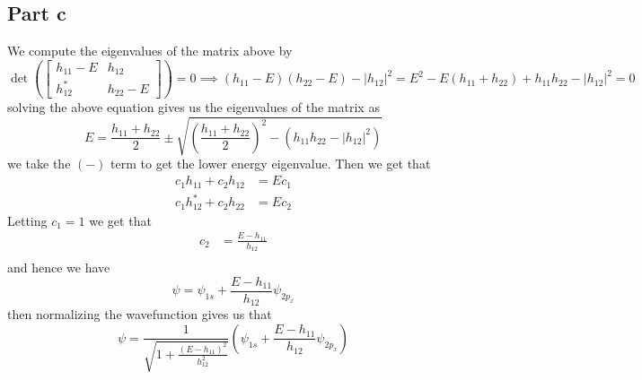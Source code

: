 \documentclass[12pt]{report}
\begin{document}
\subsection*{Part c}
We compute the eigenvalues of the matrix above by
\begin{equation*}
  \det\left(\begin{bmatrix} 
    h_{11} -E & h_{12} \\
    h_{12}^* & h_{22} - E
\end{bmatrix}\right) = 0 \implies (h_{11} - E)(h_{22} - E) - |h_{12}|^2 = E^2 - E(h_{11} + h_{22}) + h_{11}h_{22} - |h_{12}|^2 = 0
\end{equation*}
solving the above equation gives us the eigenvalues of the matrix as
\begin{equation*}
  E = \frac{h_{11} + h_{22}}{2} \pm \sqrt{\left(\frac{h_{11} + h_{22}}{2}\right)^2 - (h_{11}h_{22} - |h_{12}|^2)}
\end{equation*}
we take the $(-)$ term to get the lower energy eigenvalue. Then we get that
\begin{align*}
  c_1 h_11 + c_2 h_{12} &= E c_1 \\ 
  c_1 h^*_{12} + c_2 h_{22} &= E c_2
\end{align*}
Letting $c_1 = 1$ we get that
\begin{align*}
  c_2 &= \frac{E-h_{11}}{h_{12}} \\
\end{align*}
and hence we have 
\begin{equation*}
  \psi = \psi_{1s} + \frac{E - h_{11}}{h_{12}}\psi_{2p_x}
\end{equation*}
then normalizing the wavefunction gives us that
\begin{equation*}
  \psi = \frac{1}{\sqrt{1 + \frac{(E - h_{11})^2}{h_{12}^2}}}\left(\psi_{1s} + \frac{E - h_{11}}{h_{12}}\psi_{2p_x}\right)
\end{equation*}
\end{document}
